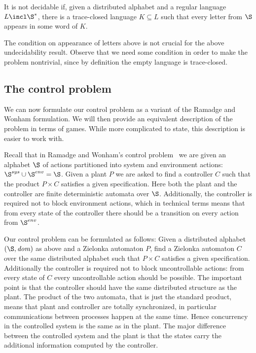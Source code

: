 \documentclass{llncs}
\newcommand{\loc}{\mathit{dom}}
\begin{document}
\medskip

\begin{theorem}\cite{SEM03}
  It is not decidable if, given a distributed alphabet and a
  regular language $L\incl \S^*$, there is a trace-closed language
  $K \subseteq L$ such that every letter from $\S$ appears in some
  word of $K$.
\end{theorem}

\medskip

The condition on appearance of letters above is not crucial for the
above undecidability result. Observe
that we need some condition in order to make the problem nontrivial,
since by definition the empty language is trace-closed.





\subsection{The control problem}

We can now formulate our control problem as a variant of the 
Ramadge and Wonham formulation. We will then provide an equivalent
description of the problem in terms of games. While more complicated
to state, this description is easier to work with. 

Recall that in Ramadge and Wonham's control problem~\cite{RW89} we are
given an alphabet $\S$ of actions partitioned into system and
environment actions: $\S^{sys}\cup\S^{env}=\S$. Given a plant $P$ we
are asked to find a controller $C$ such that the product $P\times C$
satisfies a given specification. Here both the plant and the
controller are finite deterministic automata over $\S$. Additionally,
the controller is required not to block environment actions, which in
technical terms means that from every state of the controller there
should be a transition on every action from $\S^{env}$. 


Our control problem can be formulated as follows: Given a distributed
alphabet $(\S,\loc)$ as above and a Zielonka automaton $P$,
find a Zielonka automaton $C$ over the same distributed alphabet such
that $P\times C$ satisfies a given specification. Additionally
the controller is required not to block uncontrollable actions: from
every state of $C$ every uncontrollable action  should be possible.
 The important point is
that the controller should have the same distributed structure as the
plant. The product of the two automata, that is just the standard
product, means that plant and controller are totally synchronized, in
particular communications between processes happen at the same
 time. 
Hence concurrency in the controlled system is the same as in
the plant. The major difference between the controlled system and the
plant is that the states carry the additional information computed by
the controller.
\end{document}
